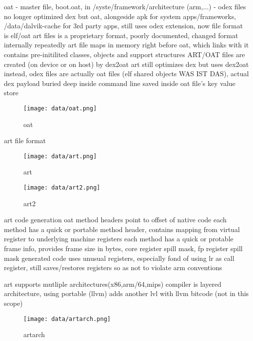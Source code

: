 oat - master file, boot.oat, in /syste/framework/architecture (arm,...) - odex files no longer optimized dex but oat, alongeside apk for system apps/frameworks, /data/dalvik-cache for 3rd party apps, still uses odex extension, now file format is elf/oat\newline
art files is a proprietary format, poorly documented, changed format internally repeatedly
art file maps in memory right before oat, which links with it
contains pre-initilited classes, objects and support structures\newline
ART/OAT files are created (on device or on host) by dex2oat
art still optimizes dex but uses dex2oat instead, odex files are actually oat files (elf shared objects WAS IST DAS), actual dex payload buried deep inside
command line saved inside oat file's key value store
\begin{figure}[h]
    \centering
    \texttt{[image: data/oat.png]}
    \caption{oat}
    \label{fig:oat}
\end{figure}
\newline

art file format
\begin{figure}[h]
    \centering
    \texttt{[image: data/art.png]}
    \caption{art}
    \label{fig:art}
\end{figure}
\begin{figure}[h]
    \centering
    \texttt{[image: data/art2.png]}
    \caption{art2}
    \label{fig:art2}
\end{figure}

art code generation
oat method headers point to offset of native code
each method has a quick or portable method header, contains mapping from virtual register to underlying machine registers
each method has a quick or protable frame info, provides frame size in bytes, core register spill mask, fp register spill mask
generated code uses unusual registers, especially fond of using lr as call register, still saves/restores registers so as not to violate arm conventions
\newline

art supports mutliple architectures(x86,arm/64,mips)
compiler is layered architecture, using portable (llvm) adds another lvl with llvm bitcode (not in this scope)
\begin{figure}[h]
    \centering
    \texttt{[image: data/artarch.png]}
    \caption{artarch}
    \label{fig:artarch}
\end{figure}

